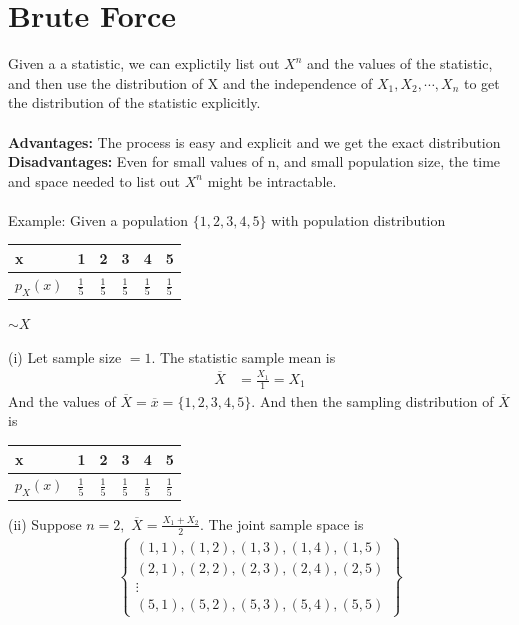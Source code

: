 \documentclass[11pt,oneside]{book}
\theoremstyle{break}
\theoremstyle{break}
\newcommand{\example}{\color{WildStrawberry}Example: \color{black}}
\begin{document}
\section[Brute Force]{\color{DarkOrchid}Brute Force}
Given a a statistic, we can explictily list out $X^n$ and the values of the statistic, and then use the distribution of X and the independence of $X_1,X_2,\cdots,X_n$ to get the distribution of the statistic explicitly.\\
\hfill\\
\textbf{Advantages: }The process is easy and explicit and we get the exact distribution\\
\textbf{Disadvantages: } Even for small values of n, and small population size, the time and space needed to list out $X^n$ might be intractable. \\
\hfill\\
\example Given a population $\{1,2,3,4,5\}$ with population distribution \begin{center}
\begin{tabular}{|l|l|l|l|l|l|}
\hline
x        & 1             & 2             & 3             & 4             & 5             \\ \hline
$p_X(x)$ & $\frac{1}{5}$ & $\frac{1}{5}$ & $\frac{1}{5}$ & $\frac{1}{5}$ & $\frac{1}{5}$ \\ \hline
\end{tabular} $\sim X$
\end{center}
(i) Let sample size $=1$. The statistic sample mean is \begin{align*}
\overline{X}&=\frac{X_1}{1}=X_1
\end{align*}
And the values of $\overline{X}=\overline{x}=\{1,2,3,4,5\}$. And then the sampling distribution of $\overline{X}$ is \begin{center}
\begin{tabular}{|l|l|l|l|l|l|}
\hline
x        & 1             & 2             & 3             & 4             & 5             \\ \hline
$p_X(x)$ & $\frac{1}{5}$ & $\frac{1}{5}$ & $\frac{1}{5}$ & $\frac{1}{5}$ & $\frac{1}{5}$ \\ \hline
\end{tabular}
\end{center}
(ii) Suppose $n=2,$ $\overline{X}=\frac{X_1+X_2}{2}$. The joint sample space is \begin{align*}
\begin{Bmatrix}
(1,1),(1,2),(1,3),(1,4),(1,5)\\
(2,1),(2,2),(2,3),(2,4),(2,5)\\
\vdots\\
(5,1),(5,2),(5,3),(5,4),(5,5)
\end{Bmatrix}
\end{align*}
\end{document}
